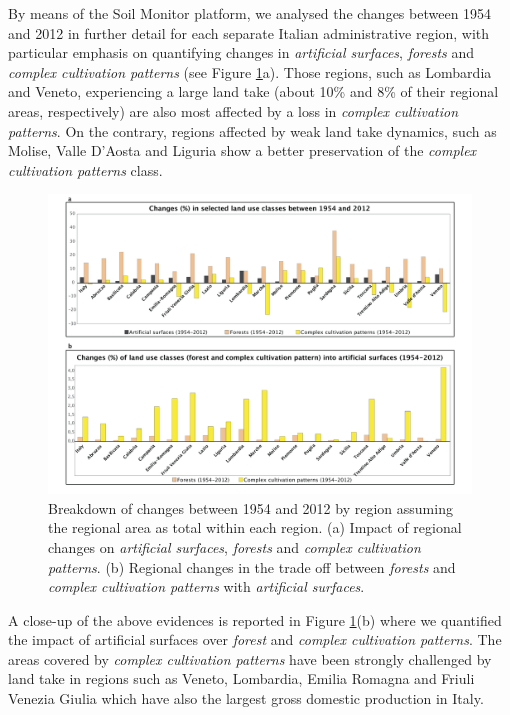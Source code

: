 \documentclass[APA,LATO1COL,doublespace]{WileyNJD-v2}
\begin{document}
By means of the Soil Monitor platform, we analysed the changes between 1954 and 2012 in further detail
for each separate Italian administrative region, with particular emphasis on quantifying changes in \textit{artificial surfaces}, \textit{forests} and \textit{complex cultivation patterns} (see Figure \ref{fig:caseIT_graphs}a).
Those regions, such as Lombardia and Veneto, experiencing a large land take (about 10\% and 8\% of their regional areas, respectively) are also most affected by a loss in \textit{complex cultivation patterns}.
On the contrary, regions affected by weak land take dynamics, such as Molise, Valle D'Aosta and Liguria show a better preservation of the \textit{complex cultivation patterns} class.

\begin{figure}
    \centerline{ \includegraphics[width=450pt]{05_caso_nazionale_grafici.pdf} }
    \caption{Breakdown of changes between 1954 and 2012 by region assuming the regional area as total within each region.
             (a) Impact of regional changes on \textit{artificial surfaces}, \textit{forests} and \textit{complex cultivation patterns}.
             (b) Regional changes in the trade off between \textit{forests} and \textit{complex cultivation patterns} with \textit{artificial surfaces}.}
    \label{fig:caseIT_graphs}
\end{figure}

A close-up of the above evidences is reported in Figure \ref{fig:caseIT_graphs}(b) where we quantified the impact of artificial surfaces over \textit{forest} and \textit{complex cultivation patterns}. 
The areas covered by \textit{complex cultivation patterns} have been strongly challenged by land take in regions such as Veneto, Lombardia, Emilia Romagna and Friuli Venezia Giulia which have also the largest gross domestic production in Italy.
\end{document}

